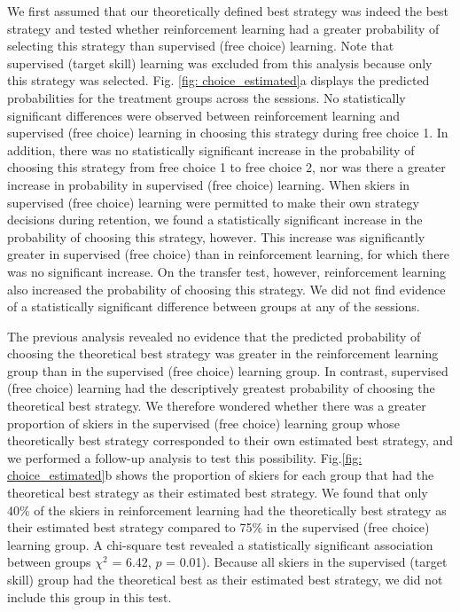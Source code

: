 \documentclass[pdflatex,sn-mathphys-num]{sn-jnl}%
\theoremstyle{thmstyleone}%
\theoremstyle{thmstyletwo}%
\theoremstyle{thmstylethree}%
\begin{document}
We first assumed that our theoretically defined best strategy was indeed the best strategy and tested whether reinforcement learning had a greater probability of selecting this strategy than supervised (free choice) learning. Note that supervised (target skill) learning was excluded from this analysis because only this strategy was selected. Fig. \ref{fig: choice_estimated}a  displays the predicted probabilities for the treatment groups across the sessions. No statistically significant differences were observed between reinforcement learning and supervised (free choice) learning in choosing this strategy during free choice 1. In addition, there was no statistically significant increase in the probability of choosing this strategy from free choice 1 to free choice 2, nor was there a greater increase in probability in supervised (free choice) learning. When skiers in supervised (free choice) learning were permitted to make their own strategy decisions during retention, we found a statistically significant increase in the probability of choosing this strategy, however. This increase was significantly greater in supervised (free choice) than in reinforcement learning, for which there was no significant increase. On the transfer test, however, reinforcement learning also increased the probability of choosing this strategy. We did not find evidence of a statistically significant difference between groups at any of the sessions.

The previous analysis revealed no evidence that the predicted probability of choosing the theoretical best strategy was greater in the reinforcement learning group than in the supervised (free choice) learning group. In contrast, supervised (free choice) learning had the descriptively greatest probability of choosing the theoretical best strategy. We therefore wondered whether there was a greater proportion of skiers in the supervised (free choice) learning group whose theoretically best strategy corresponded to their own estimated best strategy, and we performed a follow-up analysis to test this possibility. Fig.\ref{fig: choice_estimated}b shows the proportion of skiers for each group that had the theoretical best strategy as their estimated best strategy. We found that only 40\% of the skiers in reinforcement learning had the theoretically best strategy as their estimated best strategy compared to 75\% in the supervised (free choice) learning group. A chi-square test revealed a statistically significant association between groups $\chi^2$ = 6.42, $p$ = 0.01). Because all skiers in the supervised (target skill) group had the theoretical best as their estimated best strategy, we did not include this group in this test.
\end{document}
